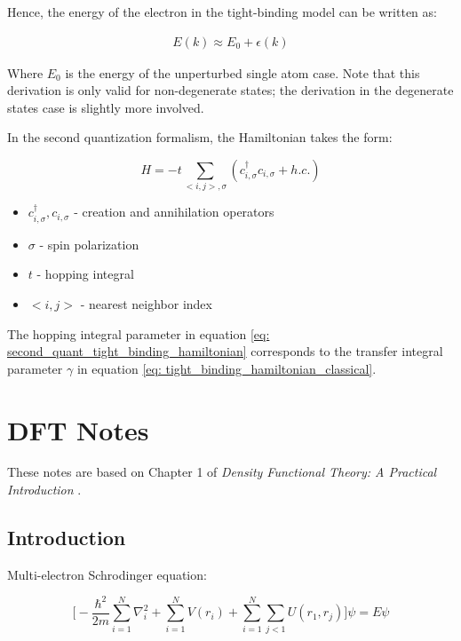 \documentclass[]{article}
\begin{document}
Hence, the energy of the electron in the tight-binding model can be written as:

\begin{align}
	E(k) \approx E_0 + \epsilon(k)
\end{align}

Where $E_0$ is the energy of the unperturbed single atom case. Note that this derivation is only valid for non-degenerate states; the derivation in the degenerate states case is slightly more involved.
\newline

In the second quantization formalism, the Hamiltonian takes the form:

\begin{equation}\label{eq: second_quant_tight_binding_hamiltonian}
	H = -t\sum_{<i,j>, \sigma} ( c_{i, \sigma}^{\dagger}c_{i, \sigma} + h.c.)
\end{equation}

\begin{itemize}
	\item $c_{i, \sigma}^{\dagger}, c_{i, \sigma}$ - creation and annihilation operators
	\item $\sigma$ - spin polarization
	\item $t$ - hopping integral
	\item $<i,j>$ - nearest neighbor index 
\end{itemize}

The hopping integral parameter in equation \ref{eq: second_quant_tight_binding_hamiltonian} corresponds to the transfer integral parameter $\gamma$ in equation \ref{eq: tight_binding_hamiltonian_classical}.


\section{DFT Notes}
These notes are based on Chapter 1 of \textit{Density Functional Theory: A Practical Introduction} \cite{DFT_A_Practical_Introduction}.
\subsection{Introduction}

Multi-electron Schrodinger equation:

\begin{equation}\label{Multi-electron SE}
\Big[-\frac{\hbar^2}{2m} \sum_{i=1}^{N}\nabla_{i}^2 + \sum_{i=1}^{N} V(r_i) + \sum_{i=1}^{N}\sum_{j<1} U(r_1, r_j) \Big ]\psi = E\psi
\end{equation}
\end{document}
